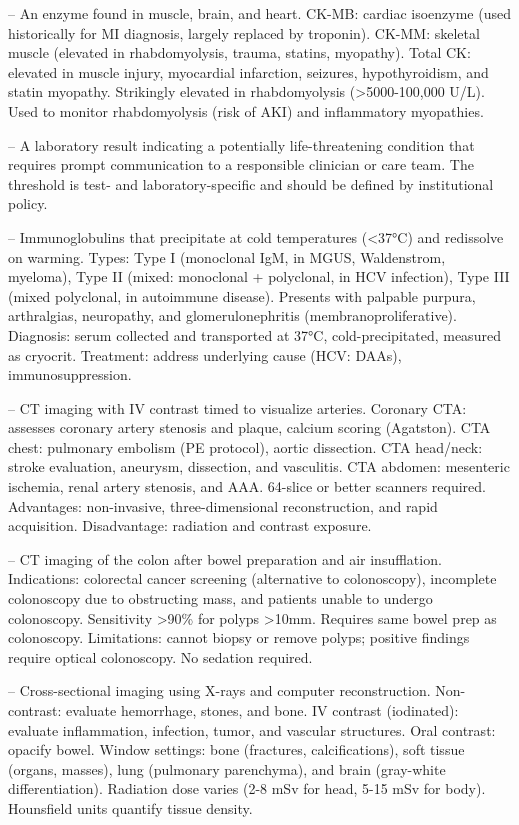 -- An enzyme found in muscle, brain, and heart. CK-MB: cardiac isoenzyme (used historically for MI diagnosis, largely replaced by troponin). CK-MM: skeletal muscle (elevated in rhabdomyolysis, trauma, statins, myopathy). Total CK: elevated in muscle injury, myocardial infarction, seizures, hypothyroidism, and statin myopathy. Strikingly elevated in rhabdomyolysis (>5000-100,000 U/L). Used to monitor rhabdomyolysis (risk of AKI) and inflammatory myopathies.

-- A laboratory result indicating a potentially life-threatening condition that requires prompt communication to a responsible clinician or care team. The threshold is test- and laboratory-specific and should be defined by institutional policy.

-- Immunoglobulins that precipitate at cold temperatures (<37°C) and redissolve on warming. Types: Type I (monoclonal IgM, in MGUS, Waldenstrom, myeloma), Type II (mixed: monoclonal + polyclonal, in HCV infection), Type III (mixed polyclonal, in autoimmune disease). Presents with palpable purpura, arthralgias, neuropathy, and glomerulonephritis (membranoproliferative). Diagnosis: serum collected and transported at 37°C, cold-precipitated, measured as cryocrit. Treatment: address underlying cause (HCV: DAAs), immunosuppression.

-- CT imaging with IV contrast timed to visualize arteries. Coronary CTA: assesses coronary artery stenosis and plaque, calcium scoring (Agatston). CTA chest: pulmonary embolism (PE protocol), aortic dissection. CTA head/neck: stroke evaluation, aneurysm, dissection, and vasculitis. CTA abdomen: mesenteric ischemia, renal artery stenosis, and AAA. 64-slice or better scanners required. Advantages: non-invasive, three-dimensional reconstruction, and rapid acquisition. Disadvantage: radiation and contrast exposure.

-- CT imaging of the colon after bowel preparation and air insufflation. Indications: colorectal cancer screening (alternative to colonoscopy), incomplete colonoscopy due to obstructing mass, and patients unable to undergo colonoscopy. Sensitivity >90\% for polyps >10mm. Requires same bowel prep as colonoscopy. Limitations: cannot biopsy or remove polyps; positive findings require optical colonoscopy. No sedation required.

-- Cross-sectional imaging using X-rays and computer reconstruction. Non-contrast: evaluate hemorrhage, stones, and bone. IV contrast (iodinated): evaluate inflammation, infection, tumor, and vascular structures. Oral contrast: opacify bowel. Window settings: bone (fractures, calcifications), soft tissue (organs, masses), lung (pulmonary parenchyma), and brain (gray-white differentiation). Radiation dose varies (2-8 mSv for head, 5-15 mSv for body). Hounsfield units quantify tissue density.

